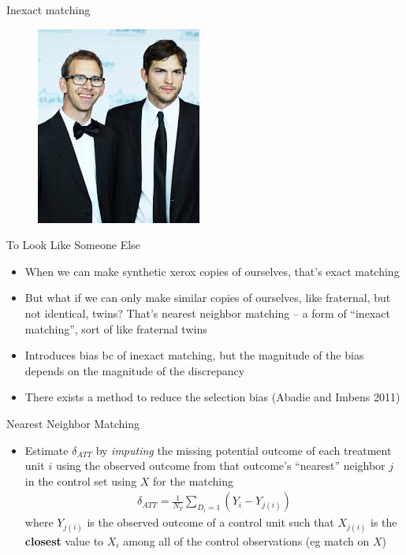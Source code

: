 \documentclass{beamer}
\begin{document}
\begin{frame}{Inexact matching}

\begin{figure}[!t]\centering
\includegraphics[scale=0.75]{./lecture_includes/fraternal_twins}
\end{figure}

\end{frame}


\begin{frame}{To Look Like Someone Else}

\begin{itemize}
\item When we can make synthetic xerox copies of ourselves, that's exact matching
\item But what if we can only make similar copies of ourselves, like fraternal, but not identical, twins? That's nearest neighbor matching -- a form of ``inexact matching'', sort of like fraternal twins
\item Introduces bias bc of inexact matching, but the magnitude of the bias depends on the magnitude of the discrepancy
\item There exists a method to reduce the selection bias (Abadie and Imbens 2011)
\end{itemize}

\end{frame}

\begin{frame}{Nearest Neighbor Matching}
	
	\begin{itemize}
	\item Estimate $\delta_{ATT}$ by \emph{imputing} the missing potential outcome of each treatment unit $i$ using the observed outcome from that outcome's ``nearest'' neighbor $j$ in the control set using $X$ for the matching
		\begin{eqnarray*}
		\delta_{ATT} = \frac{1}{N_T}\sum_{D_i=1} (Y_i - Y_{j(i)})
		\end{eqnarray*}where $Y_{j(i)}$ is the observed outcome of a control unit such that $X_{j(i)}$ is the \textbf{closest} value to $X_i$ among all of the control observations (eg match on $X$)
	\end{itemize}
\end{frame}
\end{document}
